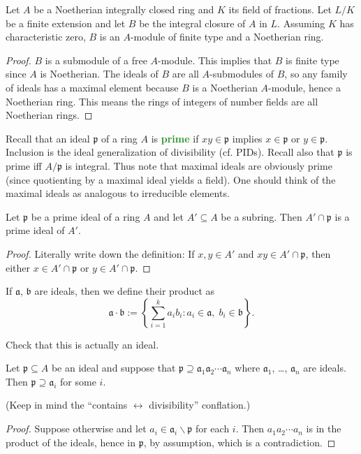 \documentclass[10pt]{scrartcl}
\providecommand{\setdiff}{\smallsetminus}
\providecommand{\vocab}[1]{{\textbf{\textcolor{ForestGreen}{#1}}}}
\begin{document}
\begin{prop}
	Let $A$ be a Noetherian integrally closed ring and $K$
	its field of fractions. Let $L/K$ be a finite extension
	and let $B$ be the integral closure of $A$ in $L$.
	Assuming $K$ has characteristic zero, $B$ is an $A$-module of finite type
	and a Noetherian ring.
\end{prop}

\begin{proof}
	$B$ is a submodule of a free $A$-module.
	This implies that $B$ is finite type since $A$ is Noetherian.
	The ideals of $B$ are all $A$-submodules of $B$,
	so any family of ideals has a maximal element
	because $B$ is a Noetherian $A$-module, hence a Noetherian ring.
	This means the rings of integers of number fields are all Noetherian rings.
\end{proof}

Recall that an ideal $\mathfrak p$ of a ring $A$ is \vocab{prime} if
$xy\in\mathfrak p$ implies $x\in\mathfrak p$ or $y\in\mathfrak p$.
Inclusion is the ideal generalization of divisibility (cf. PIDs).
Recall also that $\mathfrak p$ is prime iff $A/\mathfrak p$ is integral.
Thus note that maximal ideals are obviously prime
(since quotienting by a maximal ideal yields a field).
One should think of the maximal ideals as analogous to irreducible elements.

\begin{lemma}
	Let $\mathfrak p$ be a prime ideal of a ring $A$ and let $A'\subseteq A$
	be a subring. Then $A'\cap\mathfrak p$ is a prime ideal of $A'$.
\end{lemma}
\begin{proof}
	Literally write down the definition:
	If $x,y\in A'$ and $xy\in A'\cap\mathfrak p$,
	then either $x\in A'\cap\mathfrak p$ or $y\in A'\cap \mathfrak p$.
\end{proof}

\begin{definition}
	If $\mathfrak a$, $\mathfrak b$ are ideals, then we define their product as
	\[\mathfrak a\cdot \mathfrak b :=\left\{\sum_{i=1}^k a_ib_i :
	a_i\in\mathfrak a,\;b_i\in\mathfrak b\right\}.\]
\end{definition}
\begin{exercise}
	Check that this is actually an ideal.
\end{exercise}

\begin{lemma}
	Let $\mathfrak p\subseteq A$ be an ideal and suppose that
	$\mathfrak p\supseteq \mathfrak a_1\mathfrak a_2\cdots\mathfrak a_n$
	where $\mathfrak a_1$, \dots, $\mathfrak a_n$ are ideals.
	Then $\mathfrak p\supseteq \mathfrak a_i$ for some $i$.
\end{lemma}
(Keep in mind the ``contains $\leftrightarrow$ divisibility'' conflation.)
\begin{proof}
	Suppose otherwise and let $a_i\in \mathfrak a_i\setdiff\mathfrak p$
	for each $i$. Then $a_1a_2\cdots a_n$ is in the product of the ideals,
	hence in $\mathfrak p$, by assumption, which is a contradiction.
\end{proof}
\end{document}
